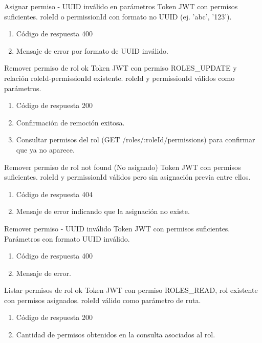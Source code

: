 {Asignar permiso - UUID inválido en parámetros}
{Token JWT con permisos suficientes.}
{roleId o permissionId con formato no UUID (ej. 'abc', '123').}
{\begin{enumerate} [leftmargin=*, nosep]
    \item Código de respuesta 400
    \item Mensaje de error por formato de UUID inválido.
\end{enumerate}}

{Remover permiso de rol ok}
{Token JWT con permiso ROLES\_UPDATE y relación roleId-permissionId existente.}
{roleId y permissionId válidos como parámetros.}
{\begin{enumerate} [leftmargin=*, nosep]
    \item Código de respuesta 200
    \item Confirmación de remoción exitosa.
    \item Consultar permisos del rol (GET /roles/:roleId/permissions) para confirmar que ya no aparece.
\end{enumerate}}

{Remover permiso de rol not found (No asignado)}
{Token JWT con permisos suficientes.}
{roleId y permissionId válidos pero sin asignación previa entre ellos.}
{\begin{enumerate} [leftmargin=*, nosep]
    \item Código de respuesta 404
    \item Mensaje de error indicando que la asignación no existe.
\end{enumerate}}

{Remover permiso - UUID inválido}
{Token JWT con permisos suficientes.}
{Parámetros con formato UUID inválido.}
{\begin{enumerate} [leftmargin=*, nosep]
    \item Código de respuesta 400
    \item Mensaje de error.
\end{enumerate}}

{Listar permisos de rol ok}
{Token JWT con permiso ROLES\_READ, rol existente con permisos asignados.}
{roleId válido como parámetro de ruta.}
{\begin{enumerate} [leftmargin=*, nosep]
    \item Código de respuesta 200
    \item Cantidad de permisos obtenidos en la consulta asociados al rol.
\end{enumerate}}

